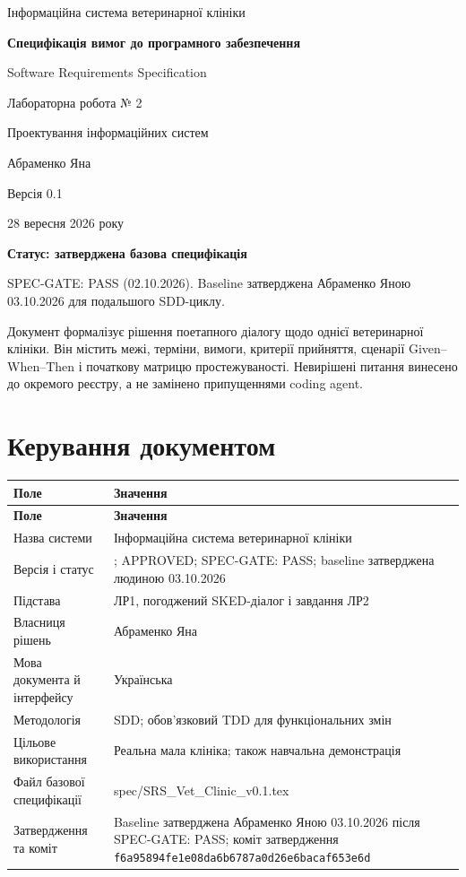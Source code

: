 \documentclass[11pt,a4paper]{article}
\begin{document}
\begin{titlepage}
\centering
{\Large Інформаційна система ветеринарної клініки\par}
\vspace{12mm}
{\LARGE\bfseries Специфікація вимог до програмного забезпечення\par}
\vspace{8mm}
{\large Software Requirements Specification\par}
\vspace{12mm}
{\large Лабораторна робота № 2\par}
{\large Проектування інформаційних систем\par}
\vspace{12mm}
Абраменко Яна\par
Версія 0.1\par
28 вересня 2026 року\par
\vfill
\textbf{Статус: затверджена базова специфікація}\par
SPEC-GATE: PASS (02.10.2026). Baseline затверджена Абраменко Яною 03.10.2026 для подальшого SDD-циклу.\par
\vspace{8mm}
\begin{minipage}{0.94\textwidth}
Документ формалізує рішення поетапного діалогу щодо однієї ветеринарної клініки.
Він містить межі, терміни, вимоги, критерії прийняття, сценарії Given–When–Then
і початкову матрицю простежуваності. Невирішені питання винесено до окремого
реєстру, а не замінено припущеннями coding agent.
\end{minipage}
\end{titlepage}
\tableofcontents
\clearpage
\section{Керування документом}
\begin{longtable}{>{\raggedright\arraybackslash}p{4cm} >{\raggedright\arraybackslash}p{11.6cm}}
\toprule
\textbf{Поле} & \textbf{Значення} \\ \midrule
\endfirsthead
\toprule
\textbf{Поле} & \textbf{Значення} \\ \midrule
\endhead
\bottomrule
\endfoot
Назва системи & Інформаційна система ветеринарної клініки \\
Версія і статус & 0.1; APPROVED; SPEC-GATE: PASS; baseline затверджена людиною 03.10.2026 \\
Підстава & ЛР1, погоджений SKED-діалог і завдання ЛР2 \\
Власниця рішень & Абраменко Яна \\
Мова документа й інтерфейсу & Українська \\
Методологія & SDD; обов’язковий TDD для функціональних змін \\
Цільове використання & Реальна мала клініка; також навчальна демонстрація \\
Файл базової специфікації & spec/SRS\_Vet\_Clinic\_v0.1.tex \\
Затвердження та коміт & Baseline затверджена Абраменко Яною 03.10.2026 після SPEC-GATE: PASS; коміт затвердження \texttt{f6a95894fe1e08da6b6787a0d26e6bacaf653e6d} \\
\end{longtable}
\end{document}

